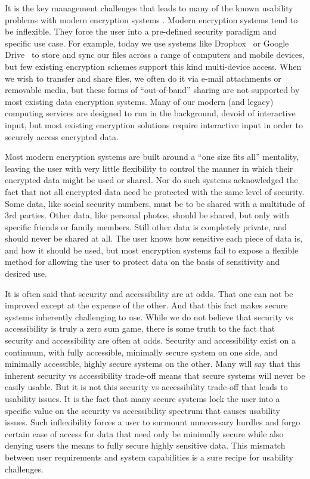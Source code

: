 It is the key management challenges that leads to many of the known
usability problems with modern encryption systems \cite{Whitten1999,
  Sweikata2009, Kher2005}. Modern encryption systems tend to be
inflexible. They force the user into a pre-defined security paradigm
and specific use case. For example, today we use systems like
Dropbox~\cite{dropbox} or Google Drive~\cite{google-drive} to store
and sync our files across a range of computers and mobile devices, but
few existing encryption schemes support this kind multi-device
access. When we wish to transfer and share files, we often do it via
e-mail attachments or removable media, but these forms of
``out-of-band'' sharing are not supported by most existing data
encryption systems. Many of our modern (and legacy) computing services
are designed to run in the background, devoid of interactive input,
but most existing encryption solutions require interactive input in
order to securely access encrypted data.

Most modern encryption systems are built around a ``one size fits
all'' mentality, leaving the user with very little flexibility to
control the manner in which their encrypted data might be used or
shared. Nor do such systems acknowledged the fact that not all
encrypted data need be protected with the same level of security. Some
data, like social security numbers, must be to be shared with a
multitude of 3rd parties. Other data, like personal photos, should be
shared, but only with specific friends or family members. Still other
data is completely private, and should never be shared at all. The
user knows how sensitive each piece of data is, and how it should be
used, but most encryption systems fail to expose a flexible method for
allowing the user to protect data on the basis of sensitivity and
desired use.

It is often said that security and accessibility are at odds. That one
can not be improved except at the expense of the other. And that this
fact makes secure systems inherently challenging to use. While we do
not believe that security vs accessibility is truly a zero sum game,
there is some truth to the fact that security and accessibility are
often at odds. Security and accessibility exist on a continuum, with
fully accessible, minimally secure system on one side, and minimally
accessible, highly secure systems on the other. Many will say that
this inherent security vs accessibility trade-off means that secure
systems will never be easily usable. But it is not this security vs
accessibility trade-off that leads to usability issues. It is the fact
that many secure systems lock the user into a specific value on the
security vs accessibility spectrum that causes usability issues. Such
inflexibility forces a user to surmount unnecessary hurdles and forgo
certain ease of access for data that need only be minimally secure
while also denying users the means to fully secure highly sensitive
data. This mismatch between user requirements and system capabilities
is a sure recipe for usability challenges.

